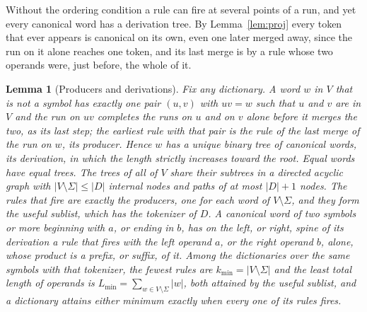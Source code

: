 \documentclass[11pt,a4paper]{article}
\theoremstyle{definition}
\theoremstyle{plain}
\newtheorem{lemma}{Lemma}
\begin{document}
Without the ordering condition a rule can fire at several points of a run, and yet every canonical word has a derivation
tree. By Lemma~\ref{lem:proj} every token that ever appears is canonical on its own, even one later merged away, since
the run on it alone reaches one token, and its last merge is by a rule whose two operands were, just before, the whole
of it.

\begin{lemma}[Producers and derivations]\label{lem:gtrees}
Fix any dictionary. A word \(w\) in \(V\) that is not a symbol has exactly one pair \((u, v)\) with \(uv = w\) such that
\(u\) and \(v\) are in \(V\) and the run on \(uv\) completes the runs on \(u\) and on \(v\) alone before it merges the
two, as its last step; the earliest rule with that pair is the rule of the last merge of the run on \(w\), its producer.
Hence \(w\) has a unique binary tree of canonical words, its derivation, in which the length strictly increases toward
the root. Equal words have equal trees. The trees of all of \(V\) share their subtrees in a directed acyclic graph with
\(|V \setminus \Sigma| \le |D|\) internal nodes and paths of at most \(|D| + 1\) nodes. The rules that fire are exactly
the producers, one for each word of \(V \setminus \Sigma\), and they form the \emph{useful sublist}, which has the
tokenizer of \(D\). A canonical word of two symbols or more beginning with \(a\), or ending in \(b\), has on the left,
or right, spine of its derivation a rule that fires with the left operand \(a\), or the right operand \(b\), alone,
whose product is a prefix, or suffix, of it. Among the dictionaries over the same symbols with that tokenizer, the
fewest rules are \(k_{\min} = |V \setminus \Sigma|\) and the least total length of operands is
\(L_{\min} = \sum_{w \in V \setminus \Sigma} |w|\), both attained by the useful sublist, and a dictionary attains either
minimum exactly when every one of its rules fires.
\end{lemma}
\end{document}
